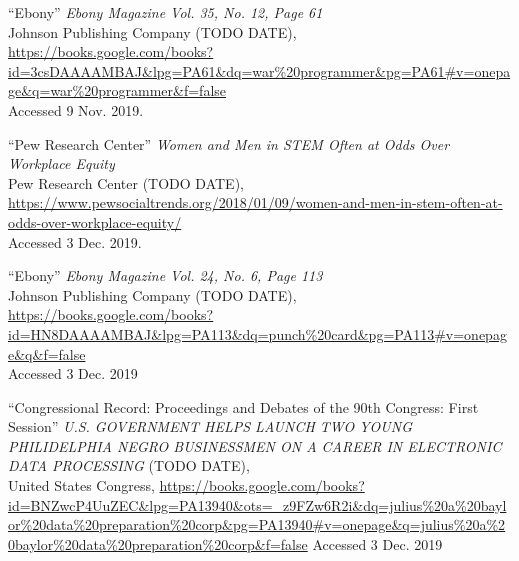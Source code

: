 \documentclass[a4paper,12pt]{article}
\begin{document}
\begin{thebibliography}{9}

``Ebony'' \textit{Ebony Magazine Vol. 35, No. 12, Page 61}\\
Johnson Publishing Company (TODO DATE),\\
\url{https://books.google.com/books?id=3csDAAAAMBAJ&lpg=PA61&dq=war%20programmer&pg=PA61#v=onepage&q=war%20programmer&f=false}\\
Accessed 9 Nov. 2019.

``Pew Research Center'' \textit{Women and Men in STEM Often at Odds Over Workplace Equity} \\
Pew Research Center (TODO DATE),\\
\url{https://www.pewsocialtrends.org/2018/01/09/women-and-men-in-stem-often-at-odds-over-workplace-equity/}\\
Accessed 3 Dec. 2019.

``Ebony''
\textit{Ebony Magazine Vol. 24, No. 6, Page 113} \\
Johnson Publishing Company (TODO DATE),\\
\url{https://books.google.com/books?id=HN8DAAAAMBAJ&lpg=PA113&dq=punch%20card&pg=PA113#v=onepage&q&f=false}\\
Accessed 3 Dec. 2019

``Congressional Record: Proceedings and Debates of the 90th Congress: First Session''
\textit{U.S. GOVERNMENT HELPS LAUNCH TWO YOUNG PHILIDELPHIA NEGRO BUSINESSMEN ON A CAREER IN ELECTRONIC DATA PROCESSING} (TODO DATE),\\
United States Congress,
\url{https://books.google.com/books?id=BNZwcP4UuZEC&lpg=PA13940&ots=_z9FZw6R2i&dq=julius%20a%20baylor%20data%20preparation%20corp&pg=PA13940#v=onepage&q=julius%20a%20baylor%20data%20preparation%20corp&f=false} %
Accessed 3 Dec. 2019

\end{thebibliography}

\newpage

\end{document}
